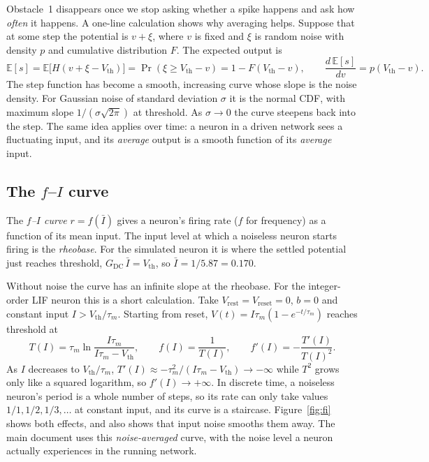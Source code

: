 \documentclass[11pt,a4paper]{article}
\newcommand{\E}{\mathbb{E}}
\newcommand{\Vth}{V_{\mathrm{th}}}
\newcommand{\Vrest}{V_{\mathrm{rest}}}
\newcommand{\Vreset}{V_{\mathrm{reset}}}
\newcommand{\GDC}{G_{\mathrm{DC}}}
\begin{document}
Obstacle~1 disappears once we stop asking whether a spike happens and ask how \emph{often} it happens. A one-line calculation shows why averaging helps. Suppose that at some step the potential is $v + \xi$, where $v$ is fixed and $\xi$ is random noise with density $p$ and cumulative distribution $F$. The expected output is
\begin{equation*}
\E[s] = \E\big[ H(v + \xi - \Vth) \big] = \Pr(\xi \ge \Vth - v) = 1 - F(\Vth - v),
\qquad \frac{d\,\E[s]}{dv} = p(\Vth - v).
\end{equation*}
The step function has become a smooth, increasing curve whose slope is the noise density. For Gaussian noise of standard deviation $\sigma$ it is the normal CDF, with maximum slope $1/(\sigma\sqrt{2\pi})$ at threshold. As $\sigma \to 0$ the curve steepens back into the step. The same idea applies over time: a neuron in a driven network sees a fluctuating input, and its \emph{average} output is a smooth function of its \emph{average} input.

\subsection{The \texorpdfstring{$f$--$I$}{f-I} curve}

The \emph{$f$--$I$ curve} $r = f(\bar I)$ gives a neuron's firing rate ($f$ for frequency) as a function of its mean input. The input level at which a noiseless neuron starts firing is the \emph{rheobase}. For the simulated neuron it is where the settled potential just reaches threshold, $\GDC\,\bar I = \Vth$, so $\bar I = 1/5.87 = 0.170$.

Without noise the curve has an infinite slope at the rheobase. For the integer-order LIF neuron this is a short calculation. Take $\Vrest = \Vreset = 0$, $b = 0$ and constant input $I > \Vth/\tau_m$. Starting from reset, $V(t) = I\tau_m(1 - e^{-t/\tau_m})$ reaches threshold at
\begin{equation*}
T(I) = \tau_m \ln \frac{I\tau_m}{I\tau_m - \Vth}, \qquad f(I) = \frac{1}{T(I)}, \qquad f'(I) = -\frac{T'(I)}{T(I)^2}.
\end{equation*}
As $I$ decreases to $\Vth/\tau_m$, $T'(I) \approx -\tau_m^2/(I\tau_m - \Vth) \to -\infty$ while $T^2$ grows only like a squared logarithm, so $f'(I) \to +\infty$. In discrete time, a noiseless neuron's period is a whole number of steps, so its rate can only take values $1/1, 1/2, 1/3, \dots$ at constant input, and its curve is a staircase. Figure~\ref{fig:fi} shows both effects, and also shows that input noise smooths them away. The main document uses this \emph{noise-averaged} curve, with the noise level a neuron actually experiences in the running network.
\end{document}
